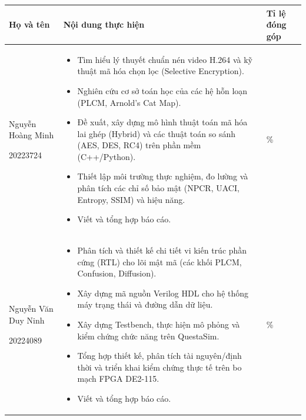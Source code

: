 \documentclass{thesis}
\begin{document}
\section*{} 

\begin{table}[H]
	\centering
	\small
	\label{Bảng phân chia công việc và mức độ đóng góp}
	\renewcommand{\arraystretch}{1.3}
	\setlength{\tabcolsep}{3pt}
	\begin{tabular}{| >{\centering}m{4cm} | m{9cm} | >{\centering\arraybackslash}m{2.5cm} |}
		\hline
		\textbf{Họ và tên} & \centering\textbf{Nội dung thực hiện} & \textbf{Tỉ lệ đóng góp} \\ 
		\hline
		Nguyễn Hoàng Minh
		
		20223724 & 
		\begin{itemize}
			\item Tìm hiểu lý thuyết chuẩn nén video H.264 và kỹ thuật mã hóa chọn lọc (Selective Encryption).
			\item Nghiên cứu cơ sở toán học của các hệ hỗn loạn (PLCM, Arnold's Cat Map).
			\item Đề xuất, xây dựng mô hình thuật toán mã hóa lai ghép (Hybrid) và các thuật toán so sánh (AES, DES, RC4) trên phần mềm (C++/Python).
			\item Thiết lập môi trường thực nghiệm, đo lường và phân tích các chỉ số bảo mật (NPCR, UACI, Entropy, SSIM) và hiệu năng.
			\item Viết và tổng hợp báo cáo.
		\end{itemize}
		& 50\% \\ \hline
		
		Nguyễn Văn Duy Ninh
		
		20224089 & 
		\begin{itemize}
			\item Phân tích và thiết kế chi tiết vi kiến trúc phần cứng (RTL) cho lõi mật mã (các khối PLCM, Confusion, Diffusion).
			\item Xây dựng mã nguồn Verilog HDL cho hệ thống máy trạng thái và đường dẫn dữ liệu.
			\item Xây dựng Testbench, thực hiện mô phỏng và kiểm chứng chức năng trên QuestaSim.
			\item Tổng hợp thiết kế, phân tích tài nguyên/định thời và triển khai kiểm chứng thực tế trên bo mạch FPGA DE2-115.
			\item Viết và tổng hợp báo cáo.
		\end{itemize}
		& 50\% \\ \hline
	\end{tabular}
\end{table}
\end{document}
